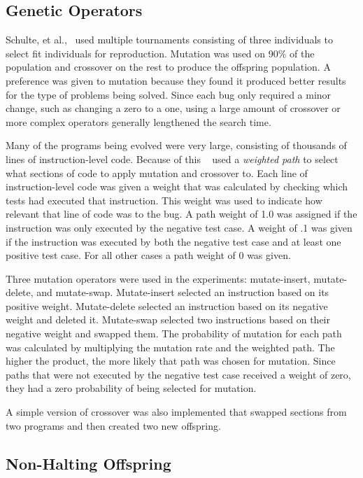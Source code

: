 \documentclass{sig-alternate}
\begin{document}
\subsection{Genetic Operators}
Schulte, et al.,~\cite{Assembly:2010} used multiple tournaments consisting of three individuals to select fit individuals for reproduction. Mutation was used on 90\% of the population and crossover on the rest to produce the offspring population. A preference was given to mutation because they found it produced better results for the type of problems being solved. Since each bug only required a minor change, such as changing a zero to a one, using a large amount of crossover or more complex operators generally lengthened the search time.

Many of the programs being evolved were very large, consisting of thousands of lines of instruction-level code. Because of this ~\cite{Assembly:2010} used a \textit{weighted path} to select what sections of code to apply mutation and crossover to. Each line of instruction-level code was given a weight that was calculated by checking which tests had executed that instruction. This weight was used to indicate how relevant that line of code was to the bug. A path weight of 1.0 was assigned if the instruction was only executed by the negative test case. A weight of .1 was given if the instruction was executed by both the negative test case and at least one positive test case. For all other cases a path weight of 0 was given.

Three mutation operators were used in the experiments: mutate-insert, mutate-delete, and mutate-swap. Mutate-insert selected an instruction based on its positive weight. Mutate-delete selected an instruction based on its negative weight and deleted it. Mutate-swap selected two instructions based on their negative weight and swapped them. The probability of mutation for each path was calculated by multiplying the mutation rate and the weighted path. The higher the product, the more likely that path was chosen for mutation. Since paths that were not executed by the negative test case received a weight of zero, they had a zero probability of being selected for mutation.\par

A simple version of crossover was also implemented that swapped sections from two programs and then created two new offspring.

\subsection{Non-Halting Offspring}
\end{document}
